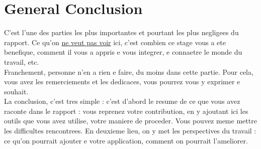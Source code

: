\chapter{General Conclusion }
\pagestyle{fancy}
\fancyhf{}
\fancyhead[R]{\bfseries\rightmark}
\fancyfoot[R]{\thepage}
\renewcommand{\headrulewidth}{0.5pt}
\renewcommand{\footrulewidth}{0pt}
\renewcommand{\chaptermark}[1]{\markboth{\MakeUppercase{\chaptername~\thechapter. #1 }}{}}
\renewcommand{\sectionmark}[1]{\markright{\thechapter.\thesection~ #1}}

\begin{spacing}{1.2}

C'est l'une des parties les plus importantes et pourtant les plus negligees 
du rapport. Ce qu'on \underline{ne veut pas voir} ici, c'est combien ce stage vous a ete benefique, comment il vous a appris e vous integrer, e connaetre le monde du travail, etc.\\
Franchement, personne n'en a rien e faire, du moins dans cette partie. Pour cela, vous 
avez les remerciements et les dedicaces, vous pourrez vous y exprimer e souhait.\\
La conclusion, c'est tres simple : c'est d'abord le resume de ce que vous avez raconte
dans le rapport : vous reprenez votre contribution, en y ajoutant ici les outils que vous 
avez utilise, votre maniere de proceder. Vous pouvez meme mettre les difficultes
rencontrees. En deuxieme lieu, on y met les perspectives du travail : ce qu'on pourrait 
ajouter e votre application, comment on pourrait l'ameliorer.

\end{spacing}